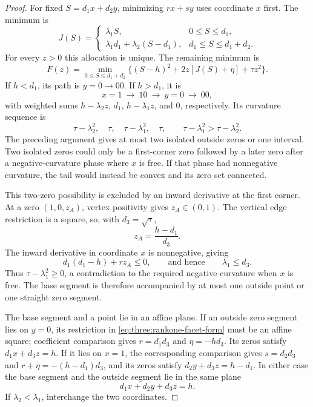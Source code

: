 \begin{proof}
For fixed $S=d_1x+d_2y$, minimizing $rx+sy$ uses coordinate $x$ first.
The minimum is
\[
 J(S)=
 \begin{cases}
  \lambda_1S,&0\le S\le d_1,\\
  \lambda_1d_1+\lambda_2(S-d_1),&d_1\le S\le d_1+d_2.
 \end{cases}
\]
For every $z>0$ this allocation is unique. The remaining minimum is
\begin{equation}\label{eq:three:allocation-value}
 F(z)=\min_{0\le S\le d_1+d_2}
       \bigl\{(S-h)^2+2z[J(S)+\eta]+\tau z^2\bigr\}.
\end{equation}
If $h<d_1$, its path is $y=0\longrightarrow00$. If $h>d_1$, it is
\[
 x=1\ \longrightarrow\ 10\ \longrightarrow\ y=0
       \ \longrightarrow\ 00,
\]
with weighted sums $h-\lambda_2z$, $d_1$, $h-\lambda_1z$, and $0$,
respectively. Its curvature sequence is
\begin{equation}\label{eq:three:allocation-curvature}
 \tau-\lambda_2^2,\quad\tau,
       \quad\tau-\lambda_1^2,\quad\tau,
 \qquad \tau-\lambda_1^2>\tau-\lambda_2^2.
\end{equation}
The preceding argument gives at most two isolated outside zeros or one
interval. Two isolated zeros could only be a first-corner zero followed
by a later zero after a negative-curvature phase where $x$ is free. If
that phase had nonnegative curvature, the tail would instead
be convex and its zero set connected.

This two-zero possibility is excluded by an inward derivative at the first
corner. At a zero $(1,0,z_A)$, vertex positivity gives $z_A\in(0,1)$.
The vertical edge restriction is a square, so, with $d_3=\sqrt\tau$,
\[
 z_A=\frac{h-d_1}{d_3}.
\]
The inward derivative in coordinate $x$ is nonnegative, giving
\[
 d_1(d_1-h)+rz_A\le0,
 \qquad\text{and hence}\qquad\lambda_1\le d_3.
\]
Thus $\tau-\lambda_1^2\ge0$, a contradiction to the required negative
curvature when $x$ is free. The base segment is therefore accompanied
by at most one outside point or one straight zero segment.

The base segment and a point lie in an affine plane. If an outside zero
segment lies on $y=0$, its restriction in \eqref{eq:three:rankone-facet-form}
must be an affine square; coefficient comparison gives
$r=d_1d_3$ and $\eta=-hd_3$. Its zeros satisfy $d_1x+d_3z=h$.
If it lies on $x=1$, the corresponding comparison gives
$s=d_2d_3$ and $r+\eta=-(h-d_1)d_3$, and its zeros satisfy
$d_2y+d_3z=h-d_1$. In either case the base segment and the outside segment
lie in the same plane
\[
 d_1x+d_2y+d_3z=h.
\]
If $\lambda_2<\lambda_1$, interchange the two coordinates.


\end{proof}
